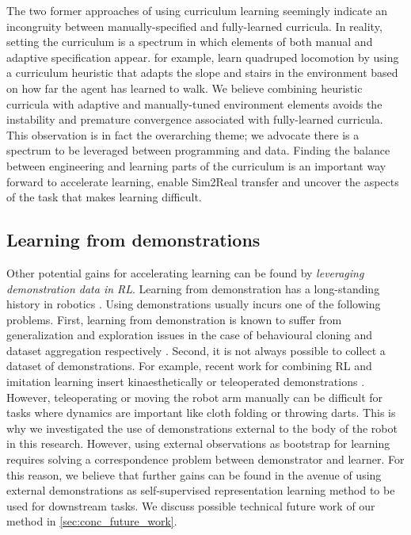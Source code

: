 \documentclass[\home/main.tex]{subfiles}
\begin{document}
The two former approaches of using curriculum learning seemingly indicate an incongruity between manually-specified and fully-learned curricula. In reality, setting the curriculum is a spectrum in which elements of both manual and adaptive specification appear. \textcite{rudin2021learning} for example, learn quadruped locomotion by using a curriculum heuristic that adapts the slope and stairs in the environment based on how far the agent has learned to walk. 
We believe combining heuristic curricula with adaptive and manually-tuned environment elements avoids the instability and premature convergence associated with fully-learned curricula. 
This observation is in fact the overarching theme; we advocate there is a spectrum to be leveraged between programming and data. Finding the balance between engineering and learning parts of the curriculum is an important way forward to accelerate learning, enable Sim2Real transfer and uncover the aspects of the task that makes learning difficult. 

\subsection{Learning from demonstrations}
Other potential gains for accelerating learning can be found by \emph{leveraging demonstration data in RL}. 
Learning from demonstration has a long-standing history in robotics \autocite{Argall2009}. Using demonstrations usually incurs one of the following problems. 
First, learning from demonstration is known to suffer from generalization and exploration issues in the case of behavioural cloning and dataset aggregation respectively \autocite{Ibarz2021}.
Second, it is not always possible to collect a dataset of demonstrations. For example, recent work for combining RL and imitation learning insert kinaesthetically \autocite{vecerik2018leveraging} or teleoperated demonstrations \autocite{Zhu-RSS-18}. However, teleoperating or moving the robot arm manually can be difficult for tasks where dynamics are important like cloth folding or throwing darts. This is why we investigated the use of demonstrations external to the body of the robot in this research. However, using external observations as bootstrap for learning requires solving a correspondence problem between demonstrator and learner. For this reason, we believe that further gains can be found in the avenue of using external demonstrations as self-supervised representation learning method to be used for downstream tasks. We discuss possible technical future work of our method in \cref{sec:conc_future_work}. 
\end{document}

